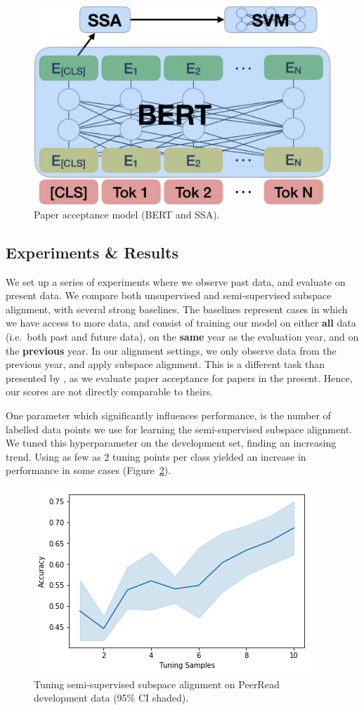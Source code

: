 \documentclass[letterpaper]{article} %
\begin{document}
\begin{figure}[!t]
    \centering
    \includegraphics[width=0.75\columnwidth]{tda_peerread.png}
    \caption{Paper acceptance model (BERT and SSA).}
    \label{fig:bertseq}
\end{figure}

\subsection{Experiments \& Results}
We set up a series of experiments where we observe past data, and evaluate on present data.
We compare both unsupervised and semi-supervised subspace alignment, with several strong baselines.
The baselines represent cases in which we have access to more data, and consist of training our model on either \textbf{all} data (i.e.~both past and future data), on the \textbf{same} year as the evaluation year, and on the \textbf{previous} year.
In our alignment settings, we only observe data from the previous year, and apply subspace alignment.
This is a different task than presented by \citeauthor{kang18naacl}, as we evaluate paper acceptance for papers in the present. Hence, our scores are not directly comparable to theirs.

One parameter which significantly influences performance, is the number of labelled data points we use for learning the semi-supervised subspace alignment.
We tuned this hyperparameter on the development set, finding an increasing trend. Using as few as 2 tuning points per class yielded an increase in performance in some cases (Figure~\ref{fig:hyperparam}).

\begin{figure}[!t]
    \centering
    \includegraphics[width=0.8\columnwidth]{tuning.png}
    \caption{Tuning semi-supervised subspace alignment on PeerRead development data (95\% CI shaded).}
    \label{fig:hyperparam}
\end{figure}
\end{document}
